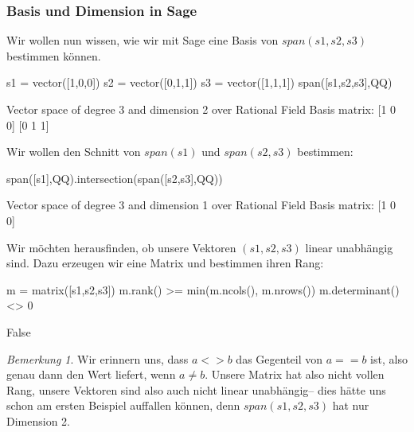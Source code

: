 \documentclass[fontsize=12pt,paper=a4,twoside,bibtotoc,idxtotoc,
liststotoc,pagesize,BCOR1.2cm,DIV15,chapterprefix,pagesize=pdftex]{scrbook}
\theoremstyle{plain}
\theoremstyle{definition}
\theoremstyle{remark}
\newtheorem{bem}[equation]{Bemerkung}
\begin{document}
\subsubsection{Basis und Dimension in Sage}
Wir wollen nun wissen, wie wir mit Sage eine Basis von $span(s1,s2,s3)$ bestimmen können.
\begin{sagein}
s1 = vector([1,0,0])
s2 = vector([0,1,1])
s3 = vector([1,1,1])
span([s1,s2,s3],QQ)
\end{sagein}
\begin{sage}
Vector space of degree 3 and dimension 2 over Rational Field
Basis matrix:
[1 0 0]
[0 1 1]
\end{sage}
 Wir wollen den Schnitt von $span(s1)$ und $span(s2,s3)$ bestimmen:
\begin{sagein}
span([s1],QQ).intersection(span([s2,s3],QQ))
\end{sagein}
\begin{sage}
Vector space of degree 3 and dimension 1 over Rational Field
Basis matrix:
[1 0 0]
\end{sage}
Wir möchten herausfinden, ob unsere Vektoren $(s1,s2,s3)$ linear unabhängig sind. Dazu erzeugen wir eine Matrix und bestimmen ihren Rang:
\begin{sagein}
m = matrix([s1,s2,s3])
m.rank() >= min(m.ncols(), m.nrows())
m.determinant() <> 0 
\end{sagein}
\begin{sage}
  False
\end{sage}
\begin{bem}
 Wir erinnern uns, dass $a <> b$ das Gegenteil von $a == b$ ist, also genau dann den Wert  liefert, wenn $a\not=b$. Unsere Matrix hat also nicht vollen Rang, 
unsere Vektoren sind also auch nicht linear unabhängig-- dies hätte uns schon am ersten Beispiel auffallen können, denn $span(s1,s2,s3)$ hat nur Dimension 2.
\end{bem}
\end{document}

